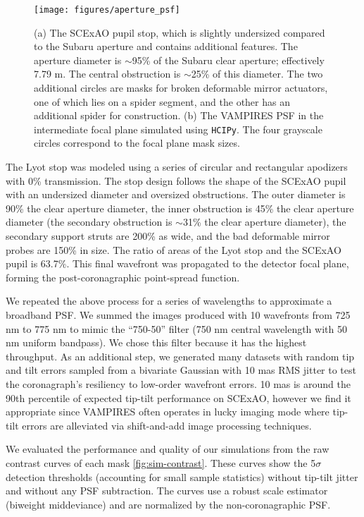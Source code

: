 \documentclass[]{spie}  %
\begin{document}
\begin{figure}
   \centering
   \texttt{[image: figures/aperture\_psf]}
   \caption{(a) The SCExAO pupil stop, which is slightly undersized compared to the Subaru aperture and contains additional features. The aperture diameter is $\sim$95\% of the Subaru clear aperture; effectively 7.79 m. The central obstruction is $\sim$25\% of this diameter. The two additional circles are masks for broken deformable mirror actuators, one of which lies on a spider segment, and the other has an additional spider for construction. (b) The VAMPIRES PSF in the intermediate focal plane simulated using \texttt{HCIPy}. The four grayscale circles correspond to the focal plane mask sizes.}\label{fig:pupil}
\end{figure}

The Lyot stop was modeled using a series of circular and rectangular apodizers with 0\% transmission. The stop design follows the shape of the SCExAO pupil with an undersized diameter and oversized obstructions. The outer diameter is 90\% the clear aperture diameter, the inner obstruction is 45\% the clear aperture diameter (the secondary obstruction is $\sim$31\% the clear aperture diameter), the secondary support struts are 200\% as wide, and the bad deformable mirror probes are 150\% in size. The ratio of areas of the Lyot stop and the SCExAO pupil is 63.7\%. This final wavefront was propagated to the detector focal plane, forming the post-coronagraphic point-spread function.

We repeated the above process for a series of wavelengths to approximate a broadband PSF. We summed the images produced with 10 wavefronts from 725 nm to 775 nm to mimic the ``750-50'' filter (750 nm central wavelength with 50 nm uniform bandpass). We chose this filter because it has the highest throughput. As an additional step, we generated many datasets with random tip and tilt errors sampled from a bivariate Gaussian with 10 mas RMS jitter to test the coronagraph's resiliency to low-order wavefront errors. 10 mas is around the 90th percentile of expected tip-tilt performance on SCExAO, however we find it appropriate since VAMPIRES often operates in lucky imaging mode where tip-tilt errors are alleviated via shift-and-add image processing techniques.

We evaluated the performance and quality of our simulations from the raw contrast curves of each mask \autoref{fig:sim-contrast}. These curves show the 5$\sigma$ detection thresholds (accounting for small sample statistics\cite{mawet2014}) without tip-tilt jitter and without any PSF subtraction. The curves use a robust scale estimator (biweight middeviance) and are normalized by the non-coronagraphic PSF.
\end{document}
